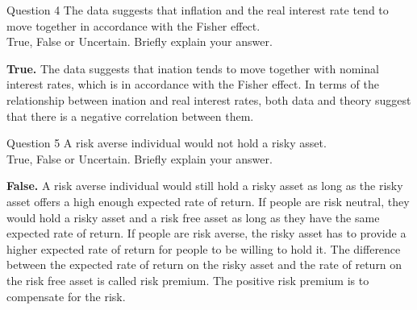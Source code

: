 \documentclass[a4paper]{article}
\newif\IfInSansMode
\numberwithin{equation}{section}
\numberwithin{figure}{section}
\begin{document}
	\begin{questionbox}{Question 4}
		The data suggests that inflation and the real interest rate tend to move together in accordance with the Fisher effect.\\
		True, False or Uncertain. Briefly explain your answer.
		\begin{explanationbox}
			\textbf{True.} The data suggests that ination tends to move together with nominal interest rates, which is in accordance with the Fisher effect. In terms of the relationship between ination and real interest rates, both data and theory suggest that there is a negative correlation between them.
		\end{explanationbox}
	\end{questionbox}
	\begin{questionbox}{Question 5}
		A risk averse individual would not hold a risky asset.\\
		True, False or Uncertain. Briefly explain your answer.
		\begin{explanationbox}
			\textbf{False.} A risk averse individual would still hold a risky asset as long as the risky asset offers a high enough expected rate of return. If people are risk neutral, they would hold a risky asset and a risk free asset as long as they have the same expected rate of return. If people are risk averse, the risky asset has to provide a higher expected rate of return for people to be willing to hold it. The difference between the expected rate of return on the risky asset and the rate of return on the risk free asset is called risk premium. The positive risk premium is to compensate for the risk.
		\end{explanationbox}
	\end{questionbox}
\end{document}
